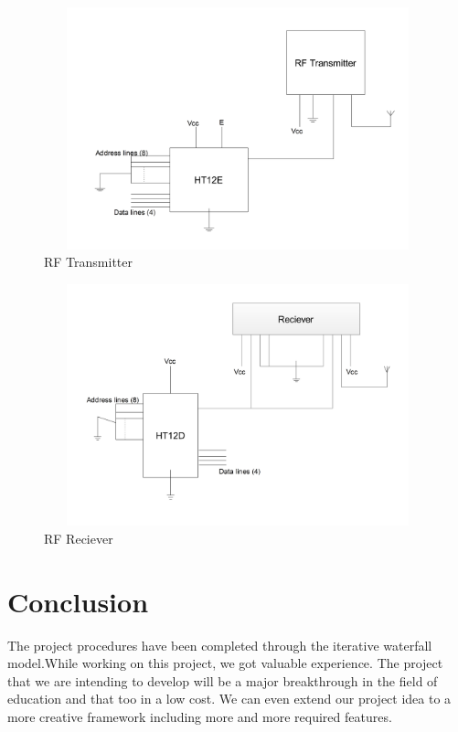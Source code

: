 \documentclass[12pt]{report}
\begin{document}
\begin{figure}[H]
\centering
\includegraphics[height=7cm,width=14cm]{tran.jpg}
\caption{ RF Transmitter}
\end{figure}
\begin{figure}[H]
\centering
\includegraphics[height=7cm,width=14cm]{rec.jpg}
\caption{ RF Reciever}
\end{figure}







\chapter{Conclusion}
The project procedures have been completed through the iterative waterfall model.While working on this project, we got valuable experience. The project that we are intending to develop will be a major breakthrough in the field of education and that too in a low cost. We can even extend our project idea to a more creative framework including more and more required features.
\end{document}

